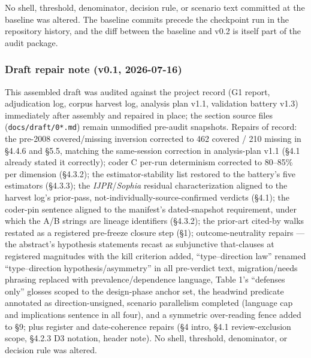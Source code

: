 No shell, threshold, denominator, decision rule, or scenario text committed at the baseline was altered. The baseline commits precede the checkpoint run in the repository history, and the diff between the baseline and v0.2 is itself part of the audit package.

\subsubsection{Draft repair note (v0.1, 2026-07-16)}\label{draft-repair-note-v0.1-2026-07-16}

This assembled draft was audited against the project record (G1 report, adjudication log, corpus harvest log, analysis plan v1.1, validation battery v1.3) immediately after assembly and repaired in place; the section source files (\texttt{docs/draft/0*.md}) remain unmodified pre-audit snapshots. Repairs of record: the pre-2008 covered/missing inversion corrected to 462 covered / 210 missing in \S{}4.4.6 and \S{}5.5, matching the same-session correction in analysis-plan v1.1 (\S{}4.1 already stated it correctly); coder C per-run determinism corrected to 80--85\% per dimension (\S{}4.3.2); the estimator-stability list restored to the battery's five estimators (\S{}4.3.3); the \emph{IJPR}/\emph{Sophia} residual characterization aligned to the harvest log's prior-pass, not-individually-source-confirmed verdicts (\S{}4.1); the coder-pin sentence aligned to the manifest's dated-snapshot requirement, under which the A/B strings are lineage identifiers (\S{}4.3.2); the prior-art cited-by walks restated as a registered pre-freeze closure step (\S{}1); outcome-neutrality repairs --- the abstract's hypothesis statements recast as subjunctive that-clauses at registered magnitudes with the kill criterion added, ``type--direction law'' renamed ``type--direction hypothesis/asymmetry'' in all pre-verdict text, migration/needs phrasing replaced with prevalence/dependence language, Table 1's ``defenses only'' glosses scoped to the design-phase anchor set, the headwind predicate annotated as direction-unsigned, scenario parallelism completed (language cap and implications sentence in all four), and a symmetric over-reading fence added to \S{}9; plus register and date-coherence repairs (\S{}4 intro, \S{}4.1 review-exclusion scope, \S{}4.2.3 D3 notation, header note). No shell, threshold, denominator, or decision rule was altered.
